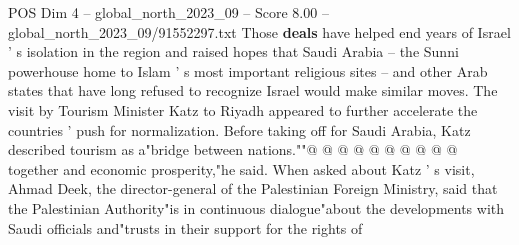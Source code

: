 \begin{textsample}{POS Dim 4 – global\_north\_2023\_09 – Score 8.00 – global\_north\_2023\_09/91552297.txt}
Those \textbf{deals} have helped end years of Israel ' s isolation in the region and raised hopes that Saudi Arabia -- the Sunni powerhouse home to Islam ' s most important religious sites -- and other Arab states that have long refused to recognize Israel would make similar moves.
The visit by Tourism Minister Katz to Riyadh appeared to further accelerate the countries ' push for normalization.
Before taking off for Saudi Arabia, Katz described tourism as a"bridge between nations.""@ @ @ @ @ @ @ @ @ @ together and economic prosperity,"he said.
When asked about Katz ' s visit, Ahmad Deek, the director-general of the Palestinian Foreign Ministry, said that the Palestinian Authority"is in continuous dialogue"about the developments with Saudi officials and"trusts in their support for the rights of

\end{textsample}
